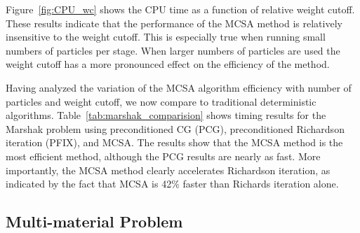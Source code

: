 \documentclass[preprint,12pt]{elsarticle}
\begin{document}
Figure~\ref{fig:CPU_wc} shows the CPU time as a function of relative
weight cutoff.  These results indicate that the performance of the
MCSA method is relatively insensitive to the weight cutoff.  This is
especially true when running small numbers of particles per stage.
When larger numbers of particles are used the weight cutoff has a more
pronounced effect on the efficiency of the method.

Having analyzed the variation of the MCSA algorithm efficiency with
number of particles and weight cutoff, we now compare to traditional
deterministic algorithms.  Table~\ref{tab:marshak_comparision} shows
timing results for the Marshak problem using preconditioned CG (PCG),
preconditioned Richardson iteration (PFIX), and MCSA. The results show
that the MCSA method is the most efficient method, although the PCG
results are nearly as fast.  More importantly, the MCSA method clearly
accelerates Richardson iteration, as indicated by the fact that MCSA
is 42\% faster than Richards iteration alone.

\subsection{Multi-material Problem}
\end{document}
